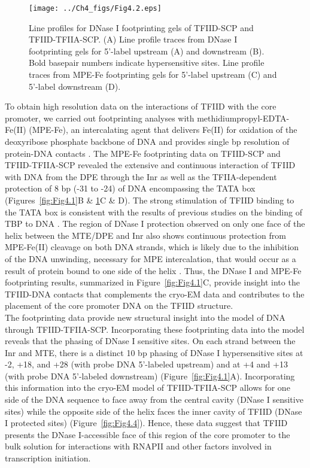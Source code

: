 \begin{figure}
\centering
\texttt{[image: ../Ch4\_figs/Fig4.2.eps]}
\caption[Line profiles for DNase I footprinting gels of TFIID-SCP and TFIID-TFIIA-SCP]{Line profiles for DNase I footprinting gels of TFIID-SCP and TFIID-TFIIA-SCP. (A) Line profile traces from DNase I footprinting gels for 5’-label upstream (A) and downstream (B). Bold basepair numbers indicate hypersensitive sites. Line profile traces from MPE-Fe footprinting gels for 5’-label upstream (C) and 5’-label downstream (D).}
\label{fig:Fig4.2}
\end{figure}
\indent To obtain high resolution data on the interactions of TFIID with the core promoter, we carried out footprinting analyses with methidiumpropyl-EDTA-Fe(II) (MPE-Fe), an intercalating agent that delivers Fe(II) for oxidation of the deoxyribose phosphate backbone of DNA and provides single bp resolution of protein-DNA contacts \cite{Hertzberg_3897,Papavassiliou_3156,Va_3928}. The MPE-Fe footprinting data on TFIID-SCP and TFIID-TFIIA-SCP revealed the extensive and continuous interaction of TFIID with DNA from the DPE through the Inr as well as the TFIIA-dependent protection of 8 bp (-31 to -24) of DNA encompassing the TATA box (Figures~\ref{fig:Fig4.1}B \& \ref{fig:Fig4.2}C \& D). The strong stimulation of TFIID binding to the TATA box is consistent with the results of previous studies on the binding of TBP to DNA \cite{Geiger_2949,Kim_3377,Kim_3416,Nikolov_3177}. The region of DNase I protection observed on only one face of the helix between the MTE/DPE and Inr also shows continuous protection from MPE-Fe(II) cleavage on both DNA strands, which is likely due to the inhibition of the DNA unwinding, necessary for MPE intercalation, that would occur as a result of protein bound to one side of the helix \cite{Uchida_3659}. Thus, the DNase I and MPE-Fe footprinting results, summarized in Figure~\ref{fig:Fig4.1}C, provide insight into the TFIID-DNA contacts that complements the cryo-EM data and contributes to the placement of the core promoter DNA on the TFIID structure. \\
\indent The footprinting data provide new structural insight into the model of DNA through TFIID-TFIIA-SCP. Incorporating these footprinting data into the model reveals that the phasing of DNase I sensitive sites. On each strand between the Inr and MTE, there is a distinct 10 bp phasing of DNase I hypersensitive sites at -2, +18, and +28 (with probe DNA 5’-labeled upstream) and at +4 and +13 (with probe DNA 5’-labeled downstream) (Figure~\ref{fig:Fig4.1}A).  Incorporating this information into the cryo-EM model of TFIID-TFIIA-SCP allows for one side of the DNA sequence to face away from the central cavity (DNase I sensitive sites) while the opposite side of the helix faces the inner cavity of TFIID (DNase I protected sites) (Figure~\ref{fig:Fig4.4}). Hence, these data suggest that TFIID presents the DNase I-accessible face of this region of the core promoter to the bulk solution for interactions with RNAPII and other factors involved in transcription initiation. \\
